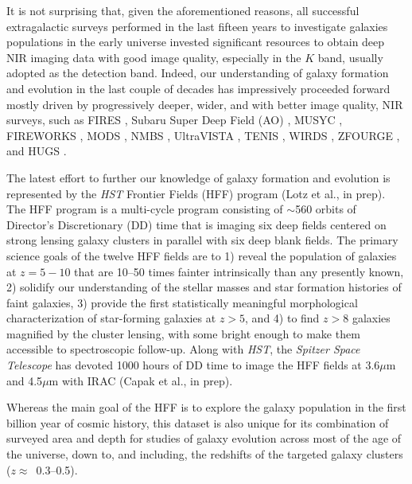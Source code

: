 \documentclass[preprint2]{aastex6}
\begin{document}
It is not surprising that, given the aforementioned reasons, all successful extragalactic surveys performed in the last fifteen years to investigate galaxies populations in the early universe invested significant resources to obtain deep NIR imaging data with good image quality, especially in the $K$ band, usually adopted as the detection band. Indeed, our understanding of galaxy formation and evolution in the last couple of decades has impressively proceeded forward mostly driven by progressively deeper, wider, and with better image quality, NIR surveys, such as FIRES \citep{labbe:03}, Subaru Super Deep Field (AO) \citep{minowa:05}, MUSYC \citep{quadri:07, taylor:09b}, FIREWORKS \citep{wuyts:fireworks}, MODS \citep{kajisawa:11}, NMBS \citep{whitaker:nmbs}, UltraVISTA \citep{mccracken:ultravista}, TENIS \citep{hsieh:tenis}, WIRDS \citep{bielby:12}, ZFOURGE \citep{spitler:12}, and HUGS \citep{hugs}.

The latest effort to further our knowledge of galaxy formation and evolution is represented by the {\it HST} Frontier Fields (HFF) program (Lotz et al., in prep). The HFF program is a multi-cycle program consisting of $\sim$560 orbits of Director's Discretionary (DD) time that is imaging six deep fields centered on strong lensing galaxy clusters in parallel with six deep blank fields. The primary science goals of the twelve HFF fields are to 1) reveal the population of galaxies at $z=5-10$ that are 10--50 times fainter intrinsically than any presently known, 2) solidify our understanding of the stellar masses and star formation histories of faint galaxies, 3) provide the first statistically meaningful morphological characterization of star-forming galaxies at $z>5$, and 4) to find $z>8$ galaxies magnified by the cluster lensing, with some bright enough to make them accessible to spectroscopic follow-up. Along with {\it HST}, the {\it Spitzer Space Telescope} has devoted 1000 hours of DD time to image the HFF fields at 3.6$\mu$m and 4.5$\mu$m with IRAC (Capak et al., in prep). 

Whereas the main goal of the HFF is to explore the galaxy population in the first billion year of cosmic history, this dataset is also unique for its combination of surveyed area and depth for studies of galaxy evolution across most of the age of the universe, down to, and including, the redshifts of the targeted galaxy clusters ($z\approx$~0.3--0.5). 
\end{document}
